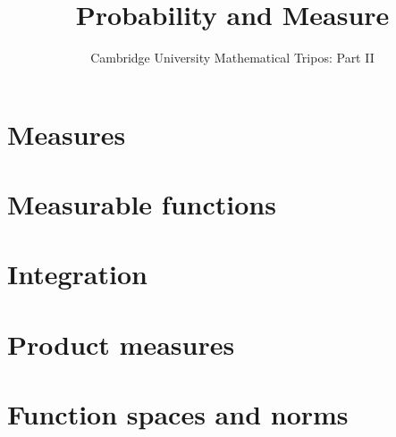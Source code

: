 \documentclass{article}
\title{Probability and Measure}
\author{Cambridge University Mathematical Tripos: Part II}
\begin{document}
\maketitle

\tableofcontentsnewpage{}

\section{Measures}

\section{Measurable functions}

\section{Integration}

\section{Product measures}

\section{Function spaces and norms}

\end{document}
